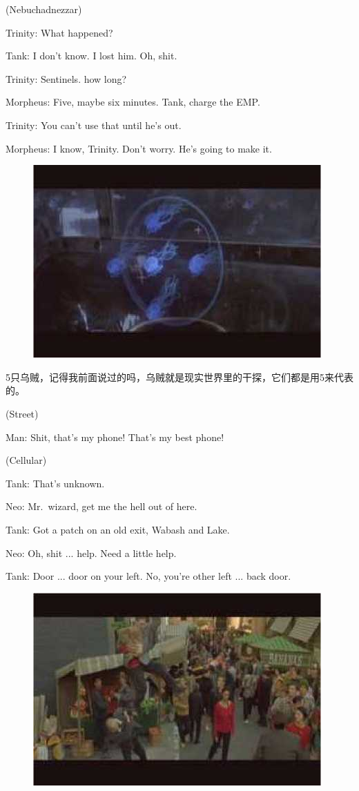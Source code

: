 \documentclass{ctexart}
\newenvironment{myquote}{\color{green} \setlength{\leftskip}{6em} \setlength{\rightskip}{4em} \setlength{\parindent}{-2em}}{\par}
\begin{document}
\begin{myquote}
(Nebuchadnezzar)

Trinity: What happened?

Tank: I don't know. I lost him. Oh, shit.

Trinity: Sentinels. how long?

Morpheus: Five, maybe six minutes. Tank, charge the EMP.

Trinity: You can't use that until he's out.

Morpheus: I know, Trinity. Don't worry. He's going to make it.
\end{myquote}

\begin{figure}[htb]
\centering
\includegraphics[width=0.5\linewidth]{fig/read_Matrix-77}
\end{figure}

5只乌贼，记得我前面说过的吗，乌贼就是现实世界里的干探，它们都是用5来代表的。

\begin{myquote}
(Street)

Man: Shit, that's my phone! That's my best phone!

(Cellular)

Tank: That's unknown.

Neo: Mr.~wizard, get me the hell out of here.

Tank: Got a patch on an old exit, Wabash and Lake.

Neo: Oh, shit ... help. Need a little help.

Tank: Door ... door on your left. No, you're other left ... back door.
\end{myquote}

\begin{figure}[htb]
\centering
\includegraphics[width=0.5\linewidth]{fig/read_Matrix-78}
\end{figure}
\end{document}
